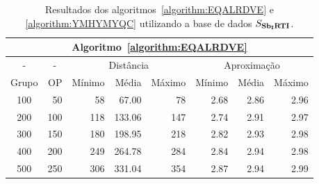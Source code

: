 \begin{table}[!htb]
  \caption{Resultados dos algoritmos~\ref{algorithm:EQALRDVE} e \ref{algorithm:YMHYMYQC} utilizando a base de dados $S_{\textbf{Sb\textsubscript{I}RTI}}{}$.}
  \label{table:SANZHOMN}
  \centering
  \begin{tabular}{|c|r|r|r|r|r|r|r|}
    \hline
    \multicolumn{8}{|c|}{Algoritmo~\ref{algorithm:EQALRDVE}}                                                                    \\ \hline
      -      & \multicolumn{1}{c|}{-} & \multicolumn{3}{c|}{Distância}             & \multicolumn{3}{c|}{Aproximação}           \\ \hline
    Grupo    & OP                     & Mínimo       & Média        & Máximo       & Mínimo       & Média        & Máximo       \\ \hline  
    100      & 50                     & 58           &  67.00       & 78           & 2.68         & 2.86         & 2.96         \\ \hline
    200      & 100                    & 118          & 133.06       & 147          & 2.74         & 2.91         & 2.97         \\ \hline
    300      & 150                    & 180          & 198.95       & 218          & 2.82         & 2.93         & 2.98         \\ \hline
    400      & 200                    & 249          & 264.78       & 284          & 2.84         & 2.94         & 2.98         \\ \hline
    500      & 250                    & 306          & 331.04       & 354          & 2.87         & 2.94         & 2.99         \\ \hline    
  \end{tabular}

  \vspace{5mm}


\end{table}
